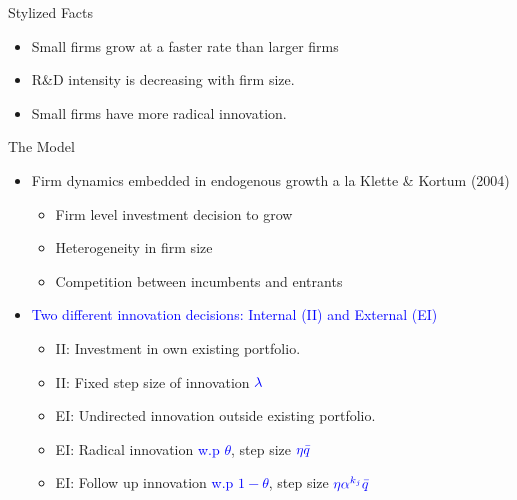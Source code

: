 \documentclass[usenames,dvipsnames,aspectratio=169]{beamer}
\begin{document}
\begin{frame}{Stylized Facts}

\begin{itemize}[label=\textcolor{teal}{$\blacktriangleright$}]
\vfill
\item Small firms grow at a faster rate than larger firms
\vfill
\item R\&D intensity is decreasing with firm size. 
\vfill
\item Small firms have more radical innovation. 
\vfill
\end{itemize}


\end{frame} 

\begin{frame}{The Model}

\begin{itemize}[label=\textcolor{teal}{$\blacktriangleright$}]
\vfill
\item Firm dynamics embedded in endogenous growth a la Klette \& Kortum (2004)
\begin{itemize}[label=\textcolor{teal}{$\star$}]
\item Firm level investment decision to grow 
\item Heterogeneity in firm size
\item Competition between incumbents and entrants
\end{itemize}
\vfill
\item \textcolor{blue}{Two different innovation decisions: Internal (II) and External (EI)}
\begin{itemize}[label=\textcolor{teal}{$\star$}]
\item II: Investment in own existing portfolio.
\item II: Fixed step size of innovation $\textcolor{blue}{\lambda}$
\item EI: Undirected innovation outside existing portfolio.  
\item EI: Radical innovation \textcolor{blue}{w.p $\theta$}, step size $\textcolor{blue}{\eta\bar{q}}$
\item EI: Follow up innovation \textcolor{blue}{w.p $1-\theta$}, step size $\textcolor{blue}{\eta\alpha^{k_j}\bar{q}}$

\end{itemize}
\vfill
\end{itemize}

\end{frame}
\end{document}
